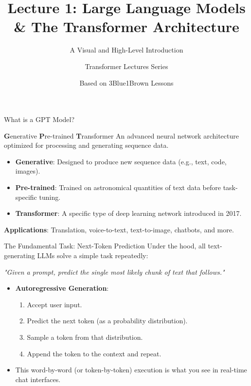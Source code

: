\documentclass[aspectratio=169]{beamer}
\title{Lecture 1: Large Language Models \& The Transformer Architecture}
\subtitle{A Visual and High-Level Introduction}
\author{Transformer Lectures Series}
\date{Based on 3Blue1Brown Lessons}
\begin{document}
\begin{frame}[plain]
  \titlepage
\end{frame}

\begin{frame}{What is a GPT Model?}
  \begin{block}{\textbf{G}enerative \textbf{P}re-trained \textbf{T}ransformer}
    An advanced neural network architecture optimized for processing and generating sequence data.
  \end{block}
  
  \begin{itemize}
    \item \textbf{Generative}: Designed to produce new sequence data (e.g., text, code, images).
    \item \textbf{Pre-trained}: Trained on astronomical quantities of text data before task-specific tuning.
    \item \textbf{Transformer}: A specific type of deep learning network introduced in 2017.
  \end{itemize}
  
  \vspace{0.2cm}
  \centering
  \textbf{Applications}: Translation, voice-to-text, text-to-image, chatbots, and more.
\end{frame}

\begin{frame}{The Fundamental Task: Next-Token Prediction}
  Under the hood, all text-generating LLMs solve a simple task repeatedly:
  \begin{center}
    \textit{"Given a prompt, predict the single most likely chunk of text that follows."}
  \end{center}
  
  \begin{itemize}
    \item \textbf{Autoregressive Generation}: 
      \begin{enumerate}
        \item Accept user input.
        \item Predict the next token (as a probability distribution).
        \item Sample a token from that distribution.
        \item Append the token to the context and repeat.
      \end{enumerate}
    \item This word-by-word (or token-by-token) execution is what you see in real-time chat interfaces.
  \end{itemize}
\end{frame}
\end{document}
